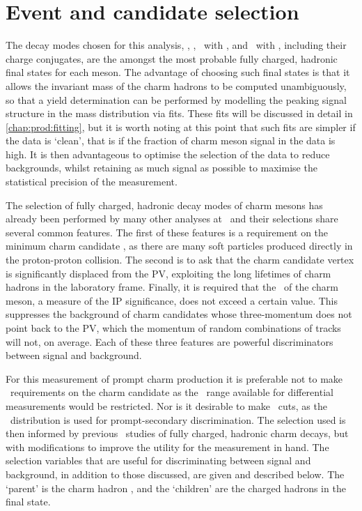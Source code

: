 \chapter{Event and candidate selection}
\label{chap:prod:sel}

The decay modes chosen for this analysis,
\DzToKpi, \DpToKpipi, \DspTophipi\ with \phiToKK, and \DstToDzpi\ with 
\DzToKpi, including their charge conjugates, are the amongst the most probable 
fully charged, hadronic final states for each meson.
The advantage of choosing such final states is that it allows the invariant 
mass of the charm hadrons to be computed unambiguously, so that a yield 
determination can be performed by modelling the peaking signal structure in the 
mass distribution via fits.
These fits will be discussed in detail in \cref{chap:prod:fitting}, but it is 
worth noting at this point that such fits are simpler if the data is `clean', 
that is if the fraction of charm meson signal in the data is high.
It is then advantageous to optimise the selection of the data to reduce 
backgrounds, whilst retaining as much signal as possible to maximise the 
statistical precision of the measurement.

The selection of fully charged, hadronic decay modes of charm mesons has 
already been performed by many other analyses at \lhcb\footnotemark\ and their 
selections share several common features.
The first of these features is a requirement on the minimum charm candidate 
\pT, as there are many soft particles produced directly in the proton-proton 
collision.
The second is to ask that the charm candidate vertex is significantly displaced 
from the \ac{PV}, exploiting the long lifetimes of charm hadrons in the 
laboratory frame.
Finally, it is required that the \ipchisq\ of the charm meson, a measure of the 
\acf{IP} significance, does not exceed a certain value.
This suppresses the background of charm candidates whose three-momentum does 
not point back to the \ac{PV}, which the momentum of random combinations of 
tracks will not, on average.
Each of these three features are powerful discriminators between signal and 
background.


For this measurement of prompt charm production it is preferable not to make 
\pT\ requirements on the charm candidate as the \pT\ range available for 
differential measurements would be restricted.
Nor is it desirable to make \ipchisq\ cuts, as the \ipchisq\ distribution is 
used for prompt-secondary discrimination.
The selection used is then informed by previous \lhcb\ studies of fully 
charged, hadronic charm decays, but with modifications to improve the utility 
for the measurement in hand.
The selection variables that are useful for discriminating between signal and 
background, in addition to those discussed, are given and described below.
The `parent' is the charm hadron \PHc, and the `children' are the charged 
hadrons in the final state.


